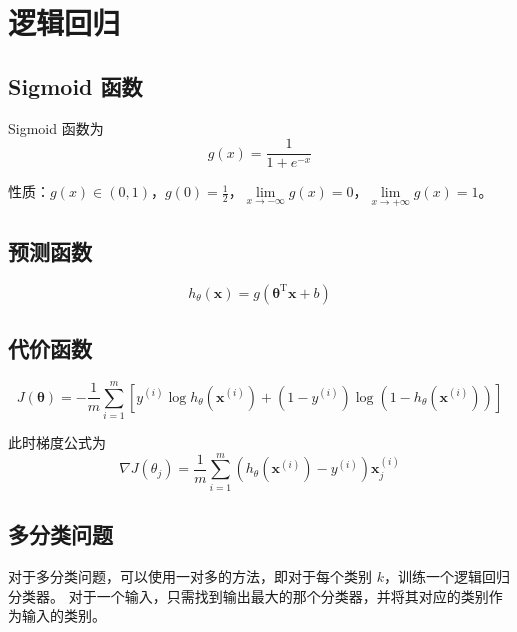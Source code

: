 \section{逻辑回归}

\subsection{Sigmoid 函数}
Sigmoid 函数为
\begin{equation}
    g(x) = \dfrac{1}{1 + e^{-x}}
\end{equation}

性质：$g(x) \in (0, 1)$，$g(0) = \frac 12$，$\lim\limits_{x \to -\infty}g(x) = 0$，$\lim\limits_{x \to +\infty}g(x) = 1$。

\subsection{预测函数}
\begin{equation}
    h_\theta(\boldsymbol{x}) = g(\boldsymbol{\theta}^\mathrm T\boldsymbol{x} + b)
\end{equation}
    
\subsection{代价函数}
\begin{equation}
    J(\boldsymbol{\theta}) = -\dfrac{1}{m}\sum_{i=1}^m\left[y^{(i)}\log h_\theta(\boldsymbol{x}^{(i)}) + (1 - y^{(i)})\log(1 - h_\theta(\boldsymbol{x}^{(i)}))\right]
\end{equation}

此时梯度公式为
\begin{equation}
    \nabla J(\theta_j) = \dfrac{1}{m}\sum_{i=1}^m(h_\theta(\boldsymbol{x}^{(i)}) - y^{(i)})\boldsymbol{x}^{(i)}_j
\end{equation}

\subsection{多分类问题}
对于多分类问题，可以使用一对多的方法，即对于每个类别 $k$，训练一个逻辑回归分类器。
对于一个输入，只需找到输出最大的那个分类器，并将其对应的类别作为输入的类别。